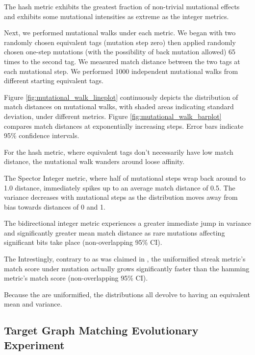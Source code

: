 The hash metric exhibits the greatest fraction of non-trivial mutational effects and exhibits some mutational intensities as extreme as the integer metrics.




Next, we performed mutational walks under each metric.
We began with two randomly chosen equivalent tags (mutation step zero) then applied randomly chosen one-step mutations (with the possibility of back mutation allowed) 65 times to the second tag.
We measured match distance between the two tags at each mutational step.
We performed 1000 independent mutational walks from different starting equivalent tags.

Figure \ref{fig:mutational_walk_lineplot} continuously depicts the distribution of match distances on mutational walks, with shaded areas indicating standard deviation, under different metrics.
Figure \ref{fig:mutational_walk_barplot} compares match distances at exponentially increasing steps.
Error bars indicate 95\% confidence intervals.

For the hash metric, where equivalent tags don't necessarily have low match distance, the mutational walk wanders around loose affinity.

The Spector Integer metric, where half of mutational steps wrap back around to 1.0 distance, immediately spikes up to an average match distance of 0.5.
The variance decreases with mutational steps as the distribution moves away from bias towards distances of 0 and 1.

The bidirectional integer metric experiences a greater immediate jump in variance and significantly greater mean match distance as rare mutations affecting significant bits take place (non-overlapping 95\% CI).

The
Intrestingly, contrary to as was claimed in \citep{downing2015intelligence}, the uniformified streak metric's match score under mutation actually grows significantly faster than the hamming metric's match score  (non-overlapping 95\% CI).

Because the are uniformified, the distributions all devolve to having an equivalent mean and variance.

\subsection{Target Graph Matching Evolutionary Experiment}


